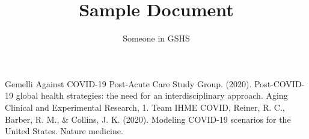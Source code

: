 \documentclass{article}
\title{Sample Document}
\author{Someone in GSHS}
\begin{document}
	
\begin{thebibliography}{99}
	 Gemelli Against COVID-19 Post-Acute Care Study Group. (2020). Post-COVID-19 global health strategies: the need for an interdisciplinary approach. Aging Clinical and Experimental Research, 1.
	 Team IHME COVID, Reiner, R. C., Barber, R. M., \& Collins, J. K. (2020). Modeling COVID-19 scenarios for the United States. Nature medicine.
\end{thebibliography}
	
\end{document}
